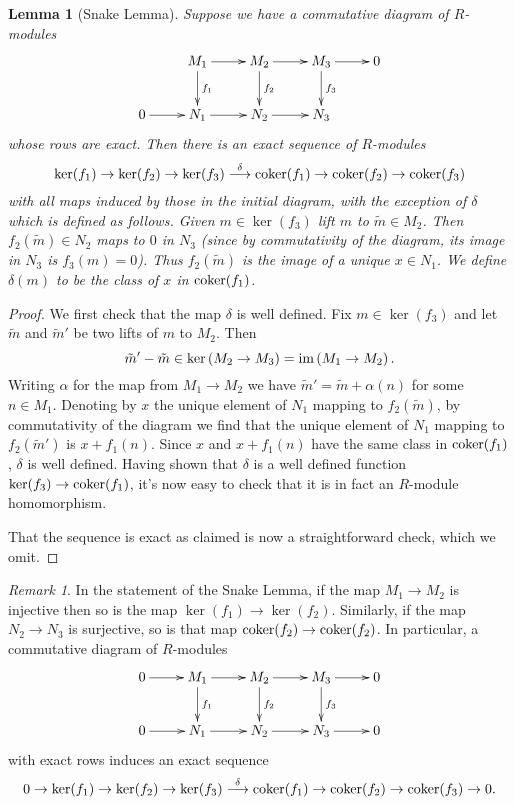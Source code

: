 \documentclass[11pt]{amsart}
\numberwithin{equation}{section}
\newtheorem{lemma}[equation]{Lemma}
\theoremstyle{remark}
\newtheorem{remark}[equation]{Remark}
\theoremstyle{remark}
\theoremstyle{remark}
\theoremstyle{definition}
\theoremstyle{definition}
\theoremstyle{definition}
\theoremstyle{definition}
\theoremstyle{definition}
\theoremstyle{definition}
\begin{document}
\begin{lemma}[Snake Lemma] \label{snake lemma}
Suppose we have a commutative diagram of $R$-modules 
\[
\xymatrix{&M_1\ar[r]\ar[d]^{f_1}&M_2\ar[r]\ar[d]^{f_2}& M_3\ar[r]\ar[d]^{f_3}&0\\0\ar[r]&N_1\ar[r]&
N_2\ar[r] &N_3&
}
\]
whose rows are exact.
Then there is an exact sequence of $R$-modules
\[\ker(f_1)\rightarrow \ker(f_2)\rightarrow \ker(f_3)\stackrel{\delta}{\longrightarrow}\textup{coker}(f_1)\rightarrow \textup{coker}(f_2)\rightarrow \textup{coker}(f_3)\]
with all maps induced by those in the initial diagram, with the exception of $\delta$ which is defined as follows. Given $m\in \ker(f_3)$ lift $m$ to $\tilde{m}\in M_2$. Then $f_2(\tilde{m})\in N_2$ maps to $0$ in $N_3$ (since by commutativity of the diagram, its image in $N_3$ is $f_3(m)=0$). Thus $f_2(\tilde{m})$ is the image of a unique $x\in N_1$. We define $\delta(m)$ to be the class of $x$ in $\textup{coker}(f_1)$.  
\end{lemma}

\begin{proof}
We first check that the map  $\delta$ is well defined. Fix $m\in \ker(f_3)$ and let $\tilde{m}$ and $\tilde{m}'$ be two lifts of $m$ to $M_2$. Then \[\tilde{m}'-
\tilde{m}\in \ker\left(M_2\rightarrow M_3\right)=\textup{im}\left(M_1\rightarrow M_2\right).\]  
Writing $\alpha$ for the map from $M_1\rightarrow M_2$ we have $\tilde{m}'=\tilde{m}+\alpha(n)$ for some $n\in M_1$. Denoting by $x$ the unique element of $N_1$ mapping to $f_2(\tilde{m})$, by commutativity of the diagram we find that the unique element of $N_1$ mapping to $f_2(\tilde{m}')$ is $x+f_1(n)$. Since $x$ and $x+f_1(n)$ have the same class in $\textup{coker}(f_1)$, $\delta$ is well defined. Having shown that $\delta$ is a well defined function $\ker(f_3)\rightarrow \textup{coker}(f_1)$, it's now easy to check that it is in fact an $R$-module homomorphism. 

That the sequence is exact as claimed is now a straightforward check, which we omit.
\end{proof}

\begin{remark}
In the statement of the Snake Lemma, if the map $M_1\rightarrow M_2$ is injective then so is the map $\ker(f_1)\rightarrow \ker(f_2)$. Similarly, if the map $N_2\rightarrow N_3$ is surjective, so is that map $\textup{coker}(f_2)\rightarrow \textup{coker}(f_2)$. In particular, a commutative diagram of $R$-modules
\[
\xymatrix{0\ar[r]&M_1\ar[r]\ar[d]^{f_1}&M_2\ar[r]\ar[d]^{f_2}& M_3\ar[r]\ar[d]^{f_3}&0\\0\ar[r]&N_1\ar[r]&
N_2\ar[r] &N_3\ar[r]&0
}
\] 
with exact rows induces an exact sequence
\[0\rightarrow \ker(f_1)\rightarrow \ker(f_2)\rightarrow \ker(f_3)\stackrel{\delta}{\longrightarrow}\textup{coker}(f_1)\rightarrow \textup{coker}(f_2)\rightarrow \textup{coker}(f_3)\rightarrow 0.\]
\end{remark}
\end{document}
